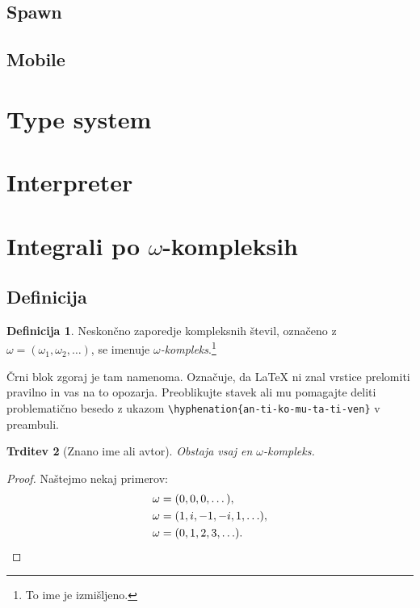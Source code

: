 \documentclass[12pt,a4paper,twoside]{article}
\theoremstyle{definition} %
\newtheorem{definicija}{Definicija}[section]
\theoremstyle{plain} %
\newtheorem{trditev}[definicija]{Trditev}
\numberwithin{equation}{section}  %
\begin{document}
\subsection{Spawn}

\subsection{Mobile}

\section{Type system}

\section{Interpreter}

\section{Integrali po \texorpdfstring{$\omega$}{ω}-kompleksih}
\subsection{Definicija}
\begin{definicija}
  Neskončno zaporedje kompleksnih števil, označeno z $\omega = (\omega_1, \omega_2, \ldots)$,
  se imenuje \emph{$\omega$-kompleks}.\footnote{To ime je izmišljeno.}

  Črni blok zgoraj je tam namenoma. Označuje, da \LaTeX{} ni znal vrstice prelomiti pravilno
  in vas na to opozarja. Preoblikujte stavek ali mu pomagajte deliti problematično besedo z
  ukazom \verb|\hyphenation{an-ti-ko-mu-ta-ti-ven}| v preambuli.
\end{definicija}
\begin{trditev}[Znano ime ali avtor]
  \label{trd:obstoj-omega}
  Obstaja vsaj en $\omega$-kompleks.
\end{trditev}
\begin{proof}
  Naštejmo nekaj primerov:
  \begin{align}
    \omega &= (0, 0, 0, \dots), \label{eq:zero-kompleks} \\
    \omega &= (1, i, -1, -i, 1, \ldots), \nonumber \\
    \omega &= (0, 1, 2, 3, \ldots). \nonumber \qedhere  %
  \end{align}
\end{proof}
\end{document}

